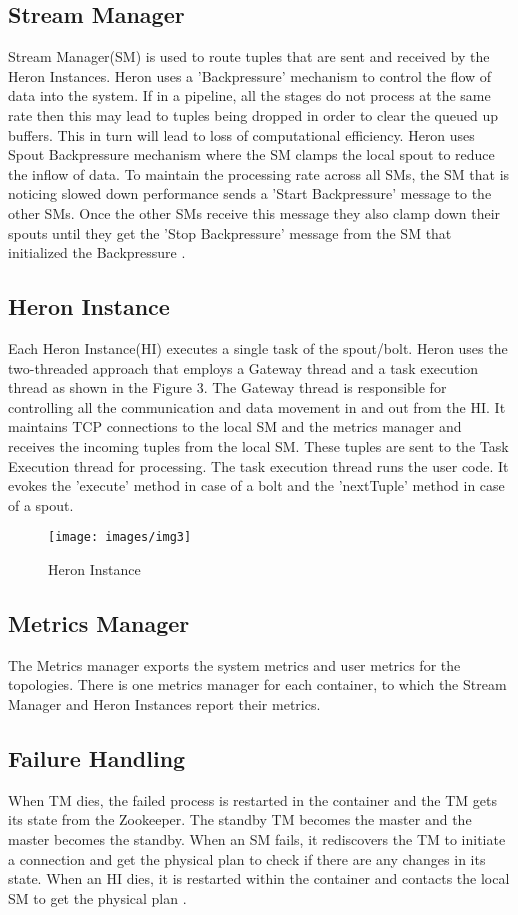 \documentclass[9pt,twocolumn,twoside]{../../styles/osajnl}
\begin{document}
\subsection{Stream Manager}
Stream Manager(SM) is used to route tuples that are sent and received by the Heron Instances. Heron uses a 'Backpressure' mechanism to control the flow of data into the system. If in a pipeline, all the stages do not process at the same rate then this may lead to tuples being dropped in order to clear the queued up buffers. This in turn will lead to loss of computational efficiency. Heron uses Spout Backpressure mechanism where the SM clamps the local spout to reduce the inflow of data. To maintain the processing rate across all SMs, the SM that is noticing slowed down performance sends a 'Start Backpressure' message to the other SMs. Once the other SMs receive this message they also clamp down their spouts until they get the 'Stop Backpressure' message from the SM that initialized the Backpressure \cite{TwitterHeron3}.
\subsection{Heron Instance}
Each Heron Instance(HI) executes a single task of the spout/bolt. Heron uses the two-threaded approach that employs a Gateway thread and a task execution thread as shown in the Figure 3. The Gateway thread is responsible for controlling all the communication and data movement in and out from the HI. It maintains TCP connections to the local SM and the metrics manager and receives the incoming tuples from the local SM. These tuples are sent to the Task Execution thread for processing. The task execution thread runs the user code. It evokes the 'execute' method in case of a bolt and the 'nextTuple' method in case of a spout.
\begin{figure}[htbp]
\begin{center}
\centering
\texttt{[image: images/img3]}
\caption{Heron Instance \cite{TwitterHeron4}}
\label{fig:false-color}
\end{center}
\end{figure}
\subsection{Metrics Manager}
The Metrics manager exports the system metrics and user metrics for the topologies. There is one metrics
manager for each container, to which the Stream Manager and Heron Instances report their metrics.
\subsection{Failure Handling}
When TM dies, the failed process is restarted in the container and the TM gets its state from the Zookeeper. The standby TM becomes the master and the master becomes the standby. When an SM fails, it rediscovers the TM to initiate a connection and get the physical plan to check if there are any changes in its state. When an HI dies, it is restarted within the container and contacts the local SM to get the physical plan \cite{TwitterHeron4}.
\end{document}

